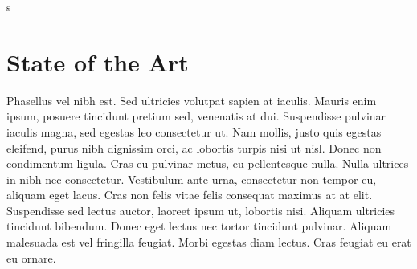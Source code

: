 s%

\chapter{State of the Art}
\label{soa}

Phasellus vel nibh est. Sed ultricies volutpat sapien at iaculis. Mauris enim ipsum, posuere tincidunt pretium sed, venenatis at dui. Suspendisse pulvinar iaculis magna, sed egestas leo consectetur ut. Nam mollis, justo quis egestas eleifend, purus nibh dignissim orci, ac lobortis turpis nisi ut nisl. Donec non condimentum ligula. Cras eu pulvinar metus, eu pellentesque nulla. Nulla ultrices in nibh nec consectetur. Vestibulum ante urna, consectetur non tempor eu, aliquam eget lacus. Cras non felis vitae felis consequat maximus at at elit. Suspendisse sed lectus auctor, laoreet ipsum ut, lobortis nisi. Aliquam ultricies tincidunt bibendum. Donec eget lectus nec tortor tincidunt pulvinar. Aliquam malesuada est vel fringilla feugiat. Morbi egestas diam lectus. Cras feugiat eu erat eu ornare.~\cite{turing1950computing}

